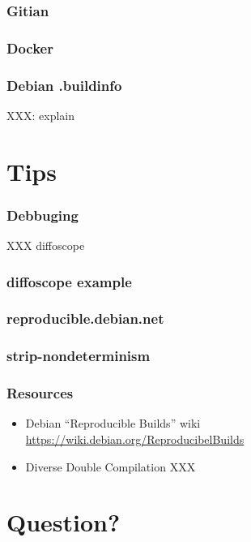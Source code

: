 \documentclass[14pt,ignorenonframetext]{beamer}
\begin{document}
\begin{frame}
 \frametitle{Gitian}

\end{frame}

\begin{frame}
 \frametitle{Docker}

\end{frame}

\begin{frame}
 \frametitle{Debian .buildinfo}

 XXX: explain
\end{frame}

\section{Tips}

\begin{frame}
 \frametitle{Debbuging}

 XXX diffoscope
\end{frame}

\begin{frame}
 \frametitle{diffoscope example}
\end{frame}

\begin{frame}
 \frametitle{reproducible.debian.net}

\end{frame}

\begin{frame}
 \frametitle{strip-nondeterminism}

\end{frame}

\begin{frame}
 \frametitle{Resources}

 \begin{itemize}
  \item Debian “Reproducible Builds” wiki \\
   \url{https://wiki.debian.org/ReproducibelBuilds}
  \item Diverse Double Compilation XXX
 \end{itemize}
\end{frame}

\section{Question?}
\end{document}
